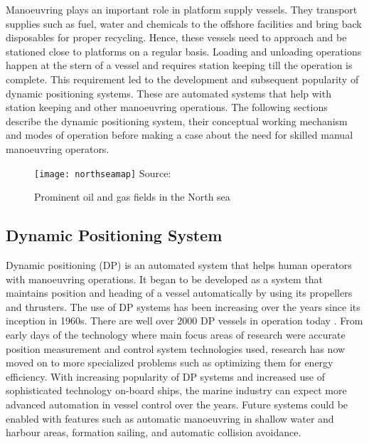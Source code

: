Manoeuvring plays an important role in platform supply vessels. They transport supplies such as fuel, water and chemicals to the offshore facilities and bring back disposables for proper recycling. Hence, these vessels need to approach and be stationed close to platforms on a regular basis. Loading and unloading operations happen at the stern of a vessel and requires station keeping till the operation is complete. This requirement led to the development and subsequent popularity of dynamic positioning systems. These are automated systems that help with station keeping and other manoeuvring operations. The following sections describe the dynamic positioning system, their conceptual working mechanism and modes of operation before making a case about the need for skilled manual manoeuvring operators.

\begin{figure}
	\centering
	\caption{Prominent oil and gas fields in the North sea}
	\texttt{[image: northseamap]}
	\label{fig:northseamap}
	\hbox{\small Source: }
\end{figure}

\subsection{Dynamic Positioning System}

Dynamic positioning (DP) is an automated system that helps human operators with manoeuvring operations. It began to be developed as a system that maintains position and heading of a vessel automatically by using its propellers and thrusters. The use of DP systems has been increasing over the years since its inception in 1960s. There are well over 2000 DP vessels in operation today \parencite{sorensen2011survey}. From early days of the technology where main focus areas of research were accurate position measurement and control system technologies used, research has now moved on to more specialized problems such as optimizing them for energy efficiency. With increasing popularity of DP systems and increased use of sophisticated technology on-board ships, the marine industry can expect more advanced automation in vessel control over the years. Future systems could be enabled with features such as automatic manoeuvring in shallow water and harbour areas, formation sailing, and automatic collision avoidance.

